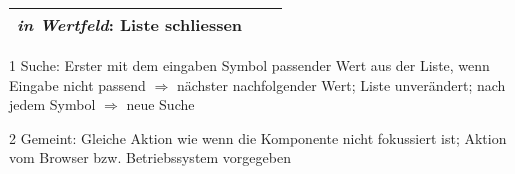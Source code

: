 \begin{table}[ht!]
\begin{threeparttable}
\begin{tabular}{ l || l | l }
{                                                  \textit{in Wertfeld}: Liste schliessen} \\
            \hline
        \end{tabular}
        \begin{tablenotes}
            \scriptsize
            \item[1] Suche: Erster mit dem eingaben Symbol passender Wert aus der Liste, wenn Eingabe nicht passend $\Rightarrow$ nächster nachfolgender Wert; 
                            Liste unverändert; nach jedem Symbol $\Rightarrow$ neue Suche
            \item[2] Gemeint: Gleiche Aktion wie wenn die Komponente nicht fokussiert ist; Aktion vom Browser bzw. Betriebssystem vorgegeben
        \end{tablenotes}
    \end{threeparttable}
\end{table}
